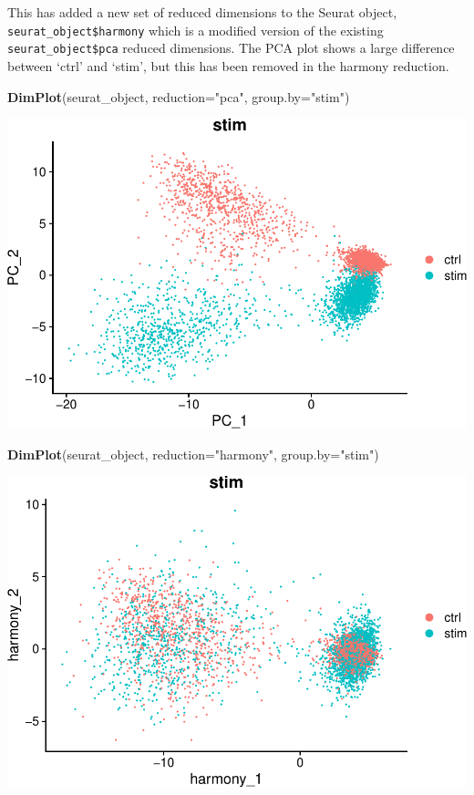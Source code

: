 \documentclass[
]{book}
\newenvironment{Shaded}{\begin{snugshade}}{\end{snugshade}}
\newcommand{\AttributeTok}[1]{\textcolor[rgb]{0.13,0.29,0.53}{#1}}
\newcommand{\FunctionTok}[1]{\textcolor[rgb]{0.13,0.29,0.53}{\textbf{#1}}}
\newcommand{\NormalTok}[1]{#1}
\newcommand{\StringTok}[1]{\textcolor[rgb]{0.31,0.60,0.02}{#1}}
\begin{document}
This has added a new set of reduced dimensions to the Seurat object, \texttt{seurat\_object\$harmony} which is a modified version of the existing \texttt{seurat\_object\$pca} reduced dimensions. The PCA plot shows a large difference between `ctrl' and `stim', but this has been removed in the harmony reduction.

\begin{Shaded}
\begin{Highlighting}[]
\FunctionTok{DimPlot}\NormalTok{(seurat\_object, }\AttributeTok{reduction=}\StringTok{"pca"}\NormalTok{, }\AttributeTok{group.by=}\StringTok{"stim"}\NormalTok{)}
\end{Highlighting}
\end{Shaded}

\includegraphics{scRNAseqInR_ABACBS_2024_Doco_files/figure-latex/harmony3-1.pdf}

\begin{Shaded}
\begin{Highlighting}[]
\FunctionTok{DimPlot}\NormalTok{(seurat\_object, }\AttributeTok{reduction=}\StringTok{"harmony"}\NormalTok{, }\AttributeTok{group.by=}\StringTok{"stim"}\NormalTok{)}
\end{Highlighting}
\end{Shaded}

\includegraphics{scRNAseqInR_ABACBS_2024_Doco_files/figure-latex/harmony3-2.pdf}
\end{document}
